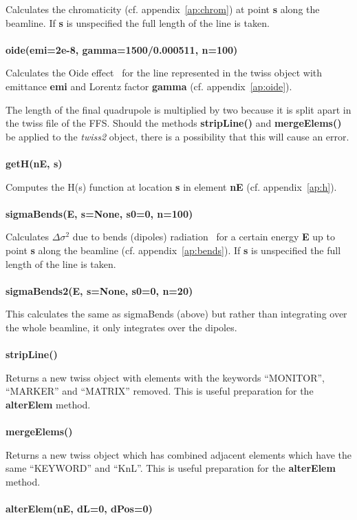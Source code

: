 \documentclass[a4paper]{cernatsnote}
\begin{document}
Calculates the chromaticity (cf. appendix~\ref{ap:chrom}) at point
\textbf{s} along the beamline. If \textbf{s} is unspecified the full
length of the line is taken.
\\\\
\textbf{oide(emi=2e-8, gamma=1500/0.000511, n=100)}

Calculates the Oide effect~\cite{oide} for the line represented in the
twiss object with emittance \textbf{emi} and Lorentz factor
\textbf{gamma} (cf. appendix~\ref{ap:oide}).

The length of the final quadrupole is multiplied by two because it is
split apart in the twiss file of the FFS. Should the methods
\textbf{stripLine()} and \textbf{mergeElems()} be applied to the
\textit{twiss2} object, there is a possibility that this will cause an
error.
\\\\
\textbf{getH(nE, s)}

Computes the H(s) function at location \textbf{s} in element
\textbf{nE} (cf. appendix~\ref{ap:h}).
\\\\
\textbf{sigmaBends(E, s=None, s0=0, n=100)}

Calculates $\Delta\sigma^2$ due to bends (dipoles)
radiation~\cite{sands} for a certain energy \textbf{E} up to point
\textbf{s} along the beamline (cf. appendix~\ref{ap:bends}). If
\textbf{s} is unspecified the full length of the line is taken.
\\\\
\textbf{sigmaBends2(E, s=None, s0=0, n=20)}

This calculates the same as sigmaBends (above) but rather than
integrating over the whole beamline, it only integrates over the
dipoles.
\\\\
\textbf{stripLine()}

Returns a new twiss object with elements with the keywords
``MONITOR'', ``MARKER'' and ``MATRIX'' removed. This
is useful preparation for the \textbf{alterElem} method.
\\\\
\textbf{mergeElems()}

Returns a new twiss object which has combined adjacent elements which
have the same ``KEYWORD'' and ``KnL''. This is useful preparation
for the \textbf{alterElem} method.
\\\\
\textbf{alterElem(nE, dL=0, dPos=0)}
\end{document}
